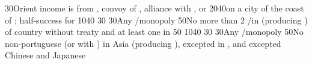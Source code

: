 %
%
%
{}{30}{Orient income is from , convoy of \villeIzmir,
  alliance with \paysaden, \paysoman or \paysgujarat}%
%
 
%
%
{20}{40}{\COL on a city of the coast of \continentIndia; half-success for
  \granderegionCeylan}%
%
%
{10}{40}{}%
%
%
{}{30}{}%
%
%
{}{30}{Any \CTZ/\STZ monopoly}%
%
%
{}{50}{No more than 2 \COL/\TP in \continentAsia (producing \POSPICE) of
  country without treaty and at least one \COL in \continentBrazil}%
%
%
%
%
{}{50}{}%
%
%
{10}{40}{}%
%
%
{}{30}{}%
%
%
{}{30}{Any \CTZ/\STZ monopoly}%
%
%
{}{50}{No non-portuguese \TP (or with \dipAT) in Asia (producing \POSPICE),
  excepted in , and excepted Chinese and Japanese
  \TP}%

\makeatother


